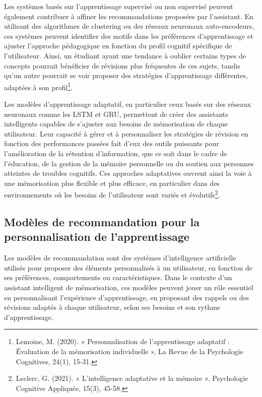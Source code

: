 \documentclass[11pt,a4paper]{report}
\begin{document}
Les systèmes basés sur l’apprentissage supervisé ou non supervisé peuvent également contribuer à affiner les recommandations proposées par l’assistant. En utilisant des algorithmes de clustering ou des réseaux neuronaux auto-encodeurs, ces systèmes peuvent identifier des motifs dans les préférences d’apprentissage et ajuster l’approche pédagogique en fonction du profil cognitif spécifique de l’utilisateur. Ainsi, un étudiant ayant une tendance à oublier certains types de concepts pourrait bénéficier de révisions plus fréquentes de ces sujets, tandis qu’un autre pourrait se voir proposer des stratégies d'apprentissage différentes, adaptées à son profil\footnote{Lemoine, M. (2020). « Personnalisation de l’apprentissage adaptatif : Évaluation de la mémorisation individuelle », La Revue de la Psychologie Cognitives, 24(1), 15-31.}.

Les modèles d’apprentissage adaptatif, en particulier ceux basés sur des réseaux neuronaux comme les LSTM et GRU, permettent de créer des assistants intelligents capables de s’ajuster aux besoins de mémorisation de chaque utilisateur. Leur capacité à gérer et à personnaliser les stratégies de révision en fonction des performances passées fait d’eux des outils puissants pour l’amélioration de la rétention d’information, que ce soit dans le cadre de l’éducation, de la gestion de la mémoire personnelle ou du soutien aux personnes atteintes de troubles cognitifs. Ces approches adaptatives ouvrent ainsi la voie à une mémorisation plus flexible et plus efficace, en particulier dans des environnements où les besoins de l’utilisateur sont variés et évolutifs\footnote{Leclerc, G. (2021). « L’intelligence adaptative et la mémoire », Psychologie Cognitive Appliquée, 15(3), 45-58.}.

\subsection{Modèles de recommandation pour la personnalisation de l'apprentissage}

Les modèles de recommandation sont des systèmes d’intelligence artificielle utilisés pour proposer des éléments personnalisés à un utilisateur, en fonction de ses préférences, comportements ou caractéristiques. Dans le contexte d’un assistant intelligent de mémorisation, ces modèles peuvent jouer un rôle essentiel en personnalisant l’expérience d’apprentissage, en proposant des rappels ou des révisions adaptés à chaque utilisateur, selon ses besoins et son rythme d’apprentissage.
\end{document}
